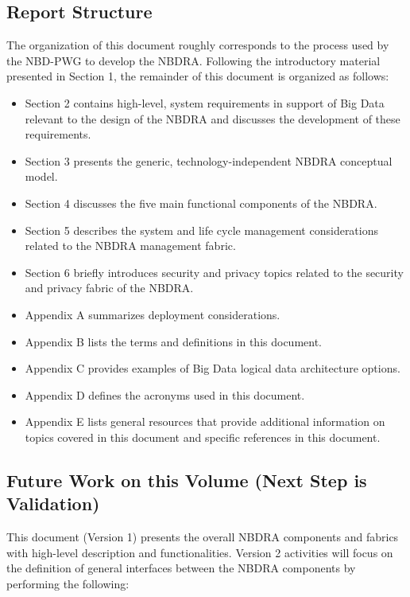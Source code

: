 \documentclass[11pt]{article}
\begin{document}
\subsection{Report Structure }

The organization of this document roughly corresponds to the process used by the NBD-PWG to develop 
the NBDRA. Following the introductory material presented in Section 1, the remainder of this document 
is organized as follows: 

\begin{itemize}
\item	Section 2 contains high-level, system requirements in support of Big Data relevant to the design 
of the NBDRA and discusses the development of these requirements. 
\item	Section 3 presents the generic, technology-independent NBDRA conceptual model.
\item	Section 4 discusses the five main functional components of the NBDRA.
\item	Section 5 describes the system and life cycle management considerations related to the NBDRA 
management fabric.
\item	Section 6 briefly introduces security and privacy topics related to the security and privacy fabric 
of the NBDRA.
\item	Appendix A summarizes deployment considerations.
\item	Appendix B lists the terms and definitions in this document.
\item	Appendix C provides examples of Big Data logical data architecture options.
\item	Appendix D defines the acronyms used in this document.
\item	Appendix E lists general resources that provide additional information on topics covered in this 
document and specific references in this document.
\end{itemize}



\subsection{Future Work on this Volume (Next Step is Validation)}

This document (Version 1) presents the overall NBDRA components and fabrics with high-level 
description and functionalities. 
Version 2 activities will focus on the definition of general interfaces between the NBDRA components by 
performing the following:
\end{document}
